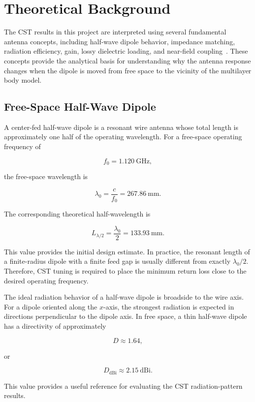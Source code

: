 \section{Theoretical Background}

The CST results in this project are interpreted using several fundamental antenna concepts, including half-wave dipole behavior, impedance matching, radiation efficiency, gain, lossy dielectric loading, and near-field coupling~\cite{stutzman2012antenna,balanis2016antenna}. These concepts provide the analytical basis for understanding why the antenna response changes when the dipole is moved from free space to the vicinity of the multilayer body model.

\subsection{Free-Space Half-Wave Dipole}

A center-fed half-wave dipole is a resonant wire antenna whose total length is approximately one half of the operating wavelength. For a free-space operating frequency of

\[
f_0 = 1.120~\mathrm{GHz},
\]

the free-space wavelength is

\[
\lambda_0 = \frac{c}{f_0}
=
267.86~\mathrm{mm}.
\]

The corresponding theoretical half-wavelength is

\[
L_{\lambda/2} = \frac{\lambda_0}{2}
=
133.93~\mathrm{mm}.
\]

This value provides the initial design estimate. In practice, the resonant length of a finite-radius dipole with a finite feed gap is usually different from exactly \(\lambda_0/2\). Therefore, CST tuning is required to place the minimum return loss close to the desired operating frequency.

The ideal radiation behavior of a half-wave dipole is broadside to the wire axis. For a dipole oriented along the \(x\)-axis, the strongest radiation is expected in directions perpendicular to the dipole axis. In free space, a thin half-wave dipole has a directivity of approximately

\[
D \approx 1.64,
\]

or

\[
D_{\mathrm{dBi}} \approx 2.15~\mathrm{dBi}.
\]

This value provides a useful reference for evaluating the CST radiation-pattern results.

